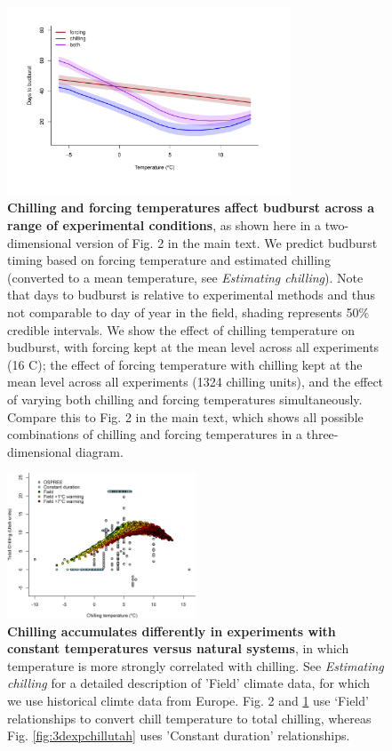 \documentclass{article}
\begin{document}
\begin{figure}[h!]
\centering
\noindent \includegraphics[width=0.75\textwidth]{..//..//analyses/bb_analysis/figures/mupredictschill_utah_pep.pdf}
\caption{\textbf{Chilling and forcing temperatures affect budburst across a range of experimental conditions}, as shown here in a two-dimensional version of Fig. 2 in the main text. We predict budburst timing based on forcing temperature and estimated chilling (converted to a mean temperature, see \emph{Estimating chilling}). Note that days to budburst is relative to experimental methods and thus not comparable to day of year in the field, shading represents 50\% credible intervals. We show the effect of chilling temperature on budburst, with forcing kept at the mean level across all experiments (16 \degree C);  the effect of forcing temperature with chilling kept at the mean level across all experiments (1324 chilling units), and  the effect of varying both chilling and forcing temperatures simultaneously.  Compare this to Fig. 2 in the main text, which shows all possible combinations of chilling and forcing temperatures in a three-dimensional diagram.}
\label{fig:2dfieldchillutah}
\end{figure}

\begin{figure}[h!]
\centering
\noindent \includegraphics[width=0.50\textwidth]{..//..//analyses/bb_analysis/figures/exp_vs_field_chill_withwarmingcols.png}
\caption{\textbf{Chilling accumulates differently in experiments with constant temperatures versus natural systems}, in which temperature is more strongly correlated with chilling. See \emph{Estimating chilling} for a detailed description of 'Field' climate data, for which we use historical climte data from Europe. Fig. 2 and \ref{fig:2dfieldchillutah} use `Field' relationships to convert chill temperature to total chilling, whereas Fig. \ref{fig:3dexpchillutah} uses 'Constant duration' relationships.}
\label{fig:chillexpfield}
\end{figure}
\end{document}
